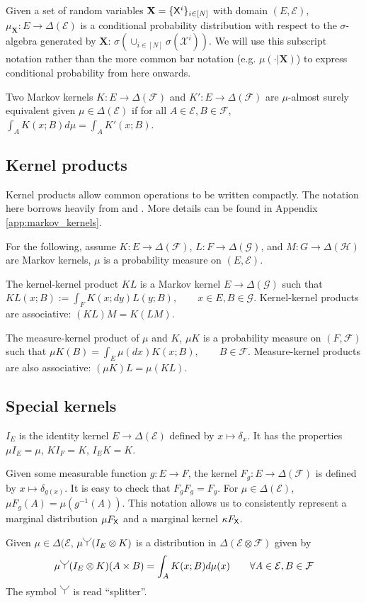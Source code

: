 Given a set of random variables $\mathbf{X}=\{\mathsf{X}^i\}_{i\in [N]}$ with domain $(E,\mathcal{E})$, $\mu_{\mathbf{X}}:E\to \Delta(\mathcal{E})$ is a conditional probability distribution with respect to the $\sigma$-algebra generated by $\mathbf{X}$: $\sigma(\cup_{i\in[N]}\sigma(\mathcal{X}^i))$.  We will use this subscript notation rather than the more common bar notation (e.g. $\mu(\cdot|\mathbf{X})$) to express conditional probability from here onwards.

Two Markov kernels $K:E\to \Delta(\mathcal{F})$ and $K':E\to \Delta(\mathcal{F})$ are $\mu$-almost surely equivalent given $\mu\in \Delta(\mathcal{E})$ if for all $A\in \mathcal{E}, B\in\mathcal{F}$, $\int_A K(x;B) d\mu = \int_A K'(x;B)$.


\subsection{Kernel products}

Kernel products allow common operations to be written compactly. The notation here borrows heavily from \cite{cinlar_probability_2011} and \cite{fong_causal_2013}. More details can be found in Appendix \ref{app:markov_kernels}.

For the following, assume $K:E\to \Delta(\mathcal{F})$, $L:F\to \Delta(\mathcal{G})$, and $M:G\to \Delta(\mathcal{H})$ are Markov kernels, $\mu$ is a probability measure on $(E,\mathcal{E})$. 

The kernel-kernel product $KL$ is a Markov kernel $E\to \Delta(\mathcal{G})$ such that $KL(x;B):= \int_F K(x;dy) L(y;B),\qquad x\in E, B\in \mathcal{G}$. Kernel-kernel products are associative: $(KL)M=K(LM)$.

The measure-kernel product of $\mu$ and $K$, $\mu K$ is a probability measure on $(F,\mathcal{F})$ such that $\mu K(B)=\int_E \mu(dx) K(x;B),\qquad B\in\mathcal{F}$. Measure-kernel products are also associative: $(\mu K)L = \mu (KL)$.

\subsection{Special kernels}

$I_E$ is the identity kernel $E\to \Delta(\mathcal{E})$ defined by $x\mapsto \delta_x$. It has the properties $\mu I_E=\mu$, $KI_F = K$, $I_E K = K$.

Given some measurable function $g:E\to F$, the kernel $F_g:E\to \Delta(\mathcal{F})$ is defined by $x\mapsto \delta_{g(x)}$. It is easy to check that $F_g F_g = F_g$. For $\mu\in \Delta(\mathcal{E})$, $\mu F_g (A) = \mu(g^{-1}(A))$. This notation allows us to consistently represent a marginal distribution $\mu F_{\mathsf{X}}$ and a marginal kernel $\kappa F_{\mathsf{X}}$.

Given $\mu\in \Delta(\mathcal{E}$, $\mu\splitter{0.15}(I_E\otimes K)$ is a distribution in $\Delta(\mathcal{E}\otimes\mathcal{F})$ given by
\begin{align}
    \mu\splitter{0.15}(I_E\otimes K)(A\times B) = \int_A K(x;B) d\mu(x)\qquad \forall A\in \mathcal{E},B\in \mathcal{F}
\end{align}
The symbol $\splitter{0.15}$ is read ``splitter''.




